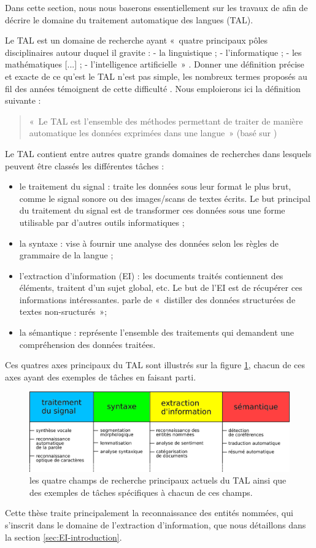 \documentclass[PhD-Yoann-Dupont.tex]{subfiles}
\begin{document}
Dans cette section, nous nous baserons essentiellement sur les travaux de \citet{cori2002constitution} afin de décrire le domaine du traitement automatique des langues (TAL).

Le TAL est un domaine de recherche ayant «\ quatre principaux pôles disciplinaires autour duquel il gravite : - la linguistique ; - l'informatique ; - les mathématiques [...] ; - l'intelligence artificielle\ » \citep{cori2002constitution}. Donner une définition précise et exacte de ce qu'est le TAL n'est pas simple, les nombreux termes proposés au fil des années témoignent de cette difficulté \citep{vauquois1969dix,cori2002constitution}. Nous emploierons ici la définition suivante :

\begin{quote}«\ Le TAL est l'ensemble des méthodes permettant de traiter de manière automatique les données exprimées dans une langue\ » (basé sur \citet{cori2002constitution,fuchs2004traitement})\end{quote}

Le TAL contient entre autres quatre grands domaines de recherches dans lesquels peuvent être classés les différentes tâches :
\begin{itemize}
    \item le traitement du signal : traite les données sous leur format le plus brut, comme le signal sonore ou des images/scans de textes écrits. Le but principal du traitement du signal est de transformer ces données sous une forme utilisable par d'autres outils informatiques ;
    \item la syntaxe : vise à fournir une analyse des données selon les règles de grammaire de la langue ;
    \item l'extraction d'information (EI) : les documents traités contiennent des éléments, traitent d'un sujet global, etc. Le but de l'EI est de récupérer ces informations intéressantes. \citet{mccallum2005information} parle de «\ distiller des données structurées de textes non-sructurés\ »;
    \item la sémantique : représente l'ensemble des traitements qui demandent une compréhension des données traitées.
\end{itemize}

Ces quatres axes principaux du TAL sont illustrés sur la figure \ref{fig:tal-timeline}, chacun de ces axes ayant des exemples de tâches en faisant parti.

\begin{figure}[ht!]
    \centering
    \includegraphics[scale=1.0]{images/TAL/frise1-TAL-couleurs}
    \caption{les quatre champs de recherche principaux actuels du TAL ainsi que des exemples de tâches spécifiques à chacun de ces champs.}
    \label{fig:tal-timeline}
\end{figure}

Cette thèse traite principalement la reconnaissance des entités nommées, qui s'inscrit dans le domaine de l'extraction d'information, que nous détaillons dans la section \ref{sec:EI-introduction}.
\end{document}
